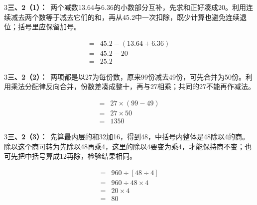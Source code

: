 \documentclass[multi=snippet,border={5bp 20bp 5bp 5bp}]{standalone}
\newenvironment{snippet}[3]{\begin{minipage}{#1bp}\color{answerred}\fontsize{#2}{#3}\selectfont\raggedright}{\end{minipage}}
\begin{document}
\begin{snippet}{505}{11.5}{14}\begin{multicols}{3}\raggedcolumns \textbf{三、2（1）：}\ 两个减数13.64与6.36的小数部分互补，先求和正好凑成20。利用连续减去两个数等于减去它们的和，再从45.2中一次扣除，既少计算也避免连续退位；括号里应保留加号。\end{multicols}\end{snippet}
\begin{snippet}{166.9}{10.5}{12.8}\SourceSans\setlength{\mathindent}{2bp}\[\begin{aligned}={}&45.2-(13.64+6.36)\\={}&45.2-20\\={}&25.2\end{aligned}\]\end{snippet}
\begin{snippet}{505}{11.5}{14}\begin{multicols}{3}\raggedcolumns \textbf{三、2（2）：}\ 两项都是以27为每份数，原来99份减去49份，可先合并为50份。利用乘法分配律反向合并，份数差凑成整十，再与27相乘；共同的27不能再作减法。\end{multicols}\end{snippet}
\begin{snippet}{163.9}{10.5}{12.8}\SourceSans\setlength{\mathindent}{2bp}\[\begin{aligned}={}&27\times(99-49)\\={}&27\times50\\={}&1350\end{aligned}\]\end{snippet}
\begin{snippet}{505}{11.5}{14}\begin{multicols}{3}\raggedcolumns \textbf{三、2（3）：}\ 先算最内层的和32加16，得到48，中括号内整体是48除以4的商。除以这个商可转为先除以48再乘4，这里的除以4要变为乘4，才能保持商不变；也可先把中括号算成12再除，检验结果相同。\end{multicols}\end{snippet}
\begin{snippet}{192.233}{10.5}{12.8}\SourceSans\setlength{\mathindent}{2bp}\[\begin{aligned}={}&960\div[48\div4]\\={}&960\div48\times4\\={}&20\times4\\={}&80\end{aligned}\]\end{snippet}
\end{document}
